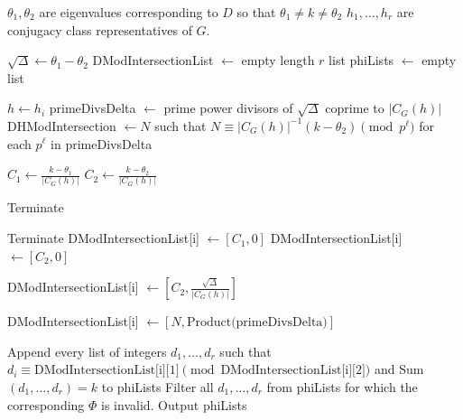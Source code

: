 \documentclass[12pt]{amsproc} %
\theoremstyle{definition}\newtheorem{defn}[thm]{Definition}
\theoremstyle{definition}\newtheorem{rem}[thm]{Remark}
\theoremstyle{definition}\newtheorem{ex}[thm]{Example}
\begin{document}
 \begin{algorithm} 
    \caption{Construct Class Intersections}
    \label{CCI}
	\begin{algorithmic}[1]
		\Ensure $\theta_1, \theta_2$ are eigenvalues corresponding to $D$ so that $\theta_1 \neq k \neq \theta_2$
		\Ensure $h_1, \dots, h_r$ are conjugacy class representatives of $G$.

		\State $\sqrt\Delta \gets \theta_1 - \theta_2$
		\State DModIntersectionList $\gets$ empty length $r$ list
		\State phiLists $\gets$ empty list

			\State $h \gets h_i$
			\State primeDivsDelta $\gets$ prime power divisors of $\sqrt\Delta$ coprime to $|C_G(h)|$
			\State DHModIntersection $\gets N$ such that $N \equiv |C_G(h)|^{-1}(k - \theta_2) \pmod{p^\ell}$ for each $p^\ell$ in primeDivsDelta
			
				\State $C_1 \gets \frac{k-\theta_1}{|C_G(h)|}$
				\State $C_2 \gets \frac{k-\theta_2}{|C_G(h)|}$
	
						\State Terminate
					\EndIf
					
				\EndFor
	\end{algorithmic}
\end{algorithm}
\begin{algorithm}
	\begin{algorithmic} [1]
						\State Terminate
					\State DModIntersectionList[i] $\gets [C_1, 0]$
					\State DModIntersectionList[i] $\gets [C_2, 0]$

				\Else
					\State DModIntersectionList[i] $\gets [C_2, \frac{\sqrt\Delta}{|C_G(h)|}]$
				\EndIf

				\Else
					\State DModIntersectionList[i] $\gets [N, \text{Product(primeDivsDelta)}]$
				\EndIf
			\EndFor

			\State Append every list of integers $d_1, \dots, d_r$ such that $d_i \equiv \text{DModIntersectionList[i][1]} \pmod{\text{DModIntersectionList[i][2]}}$ and Sum$(d_1, \dots, d_r) = k$ to phiLists
			\State Filter all $d_1, \dots, d_r$ from phiLists for which the corresponding $\Phi$ is invalid.
			\State Output phiLists
		\end{algorithmic}
\end{algorithm}
\end{document}
